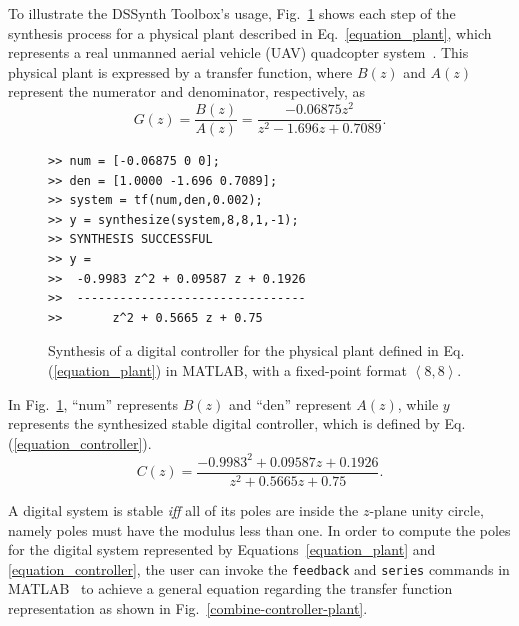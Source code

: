 \documentclass[10pt,conference]{IEEEtran}
\newcommand\tool{{DSSynth Toolbox}\xspace}
\begin{document}
To illustrate the \tool's usage, Fig.~\ref{toolbox-usage} shows each step of the 
synthesis process for a physical plant described in Eq.~\eqref{equation_plant},
which represents a real unmanned aerial vehicle (UAV) quadcopter system~\cite{bouabdallah}. 
This physical plant is expressed by a transfer function, where 
$B(z)$ and $A(z)$ represent the numerator and denominator, respectively, as
%
\begin{equation}
\label{equation_plant}
G(z)=\frac{B(z)}{A(z)}=\frac{-0.06875z^{2}}{z^2-1.696z+0.7089}.
\end{equation}

\begin{figure}[ht]
\scriptsize
\begin{lstlisting}[xleftmargin=.025\textwidth,xrightmargin=.025\textwidth, frame=single,]
>> num = [-0.06875 0 0];
>> den = [1.0000 -1.696 0.7089];
>> system = tf(num,den,0.002);
>> y = synthesize(system,8,8,1,-1);
>> SYNTHESIS SUCCESSFUL
>> y = 
>>  -0.9983 z^2 + 0.09587 z + 0.1926
>>  --------------------------------
>>       z^2 + 0.5665 z + 0.75
\end{lstlisting}
\vspace{-0.2cm}
\caption{Synthesis of a digital controller for the physical plant defined in Eq.(\ref{equation_plant}) in MATLAB, with a fixed-point format  $\left\langle 8,8\right\rangle$.}
\label{toolbox-usage}
\end{figure}

In Fig.~\ref{toolbox-usage}, ``num'' represents $B(z)$ and ``den'' represent $A(z)$, while 
$y$ represents the synthesized stable digital controller, which is defined by Eq.(\ref{equation_controller}).
%
\begin{equation}
\label{equation_controller}
C(z)=\frac{-0.9983^{2}+0.09587z+0.1926}{z^2+0.5665z+0.75}.
\end{equation}

A digital system is stable \textit{iff} all of its poles are inside the $z$-plane unity circle, 
namely poles must have the modulus less than one. In order to compute the poles for the digital 
system represented by Equations~\eqref{equation_plant} and \eqref{equation_controller}, 
the user can invoke the \texttt{feedback} and \texttt{series} commands in MATLAB~\cite{matlab-toolbox} 
to achieve a general equation regarding the transfer function representation as shown in Fig.~\ref{combine-controller-plant}. 
\end{document}
